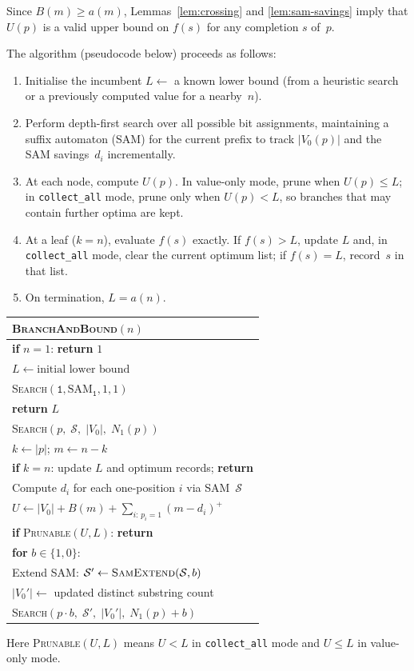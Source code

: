 \documentclass[11pt,a4paper]{article}
\theoremstyle{plain}
\theoremstyle{definition}
\theoremstyle{remark}
\newcommand{\ones}{N_1}
\begin{document}
Since $B(m) \ge a(m)$, Lemmas~\ref{lem:crossing} and
\ref{lem:sam-savings} imply that $U(p)$ is a valid upper bound on
$f(s)$ for any completion $s$ of~$p$.

The algorithm (pseudocode below) proceeds as follows:
\begin{enumerate}[nosep]
  \item Initialise the incumbent $L \gets$ a known lower bound (from
    a heuristic search or a previously computed value for a
    nearby~$n$).
  \item Perform depth-first search over all possible bit assignments,
    maintaining a suffix automaton (SAM) for the current prefix to
    track $|V_0(p)|$ and the SAM savings~$d_i$ incrementally.
  \item At each node, compute $U(p)$.  In value-only mode, prune when
    $U(p) \le L$; in \texttt{collect\_all} mode, prune only when
    $U(p) < L$, so branches that may contain further optima are kept.
  \item At a leaf ($k = n$), evaluate $f(s)$ exactly.  If $f(s)>L$,
    update $L$ and, in \texttt{collect\_all} mode, clear the current
    optimum list; if $f(s)=L$, record~$s$ in that list.
  \item On termination, $L = a(n)$.
\end{enumerate}

\begin{center}
\begin{tabular}{l}
\toprule
\textsc{BranchAndBound}$(n)$ \\
\midrule
\textbf{if} $n = 1$: \quad \textbf{return} $1$ \\
$L \gets \text{initial lower bound}$ \\
\textsc{Search}$(\mathtt{1}, \text{SAM}_{\mathtt{1}}, 1, 1)$ \\
\textbf{return} $L$ \\[4pt]
\textsc{Search}$(p,\; \mathcal{S},\; |V_0|,\; \ones(p))$ \\
\quad $k \gets |p|$; \quad $m \gets n - k$ \\
\quad \textbf{if} $k = n$: \quad update $L$ and optimum records; \quad \textbf{return} \\
\quad Compute $d_i$ for each one-position $i$ via SAM~$\mathcal{S}$ \\
\quad $U \gets |V_0| + B(m) + \sum_{i:\, p_i=1} (m - d_i)^+$ \\
\quad \textbf{if} \textsc{Prunable}$(U,L)$: \quad \textbf{return} \\
\quad \textbf{for} $b \in \{1, 0\}$: \\
\quad\quad Extend SAM: $\mathcal{S}' \gets \textsc{SamExtend}(\mathcal{S}, b)$ \\
\quad\quad $|V_0'| \gets$ updated distinct substring count \\
\quad\quad \textsc{Search}$(p \cdot b,\; \mathcal{S}',\; |V_0'|,\; \ones(p) + b)$ \\
\bottomrule
\end{tabular}
\end{center}
Here \textsc{Prunable}$(U,L)$ means $U < L$ in \texttt{collect\_all}
mode and $U \le L$ in value-only mode.
\end{document}

